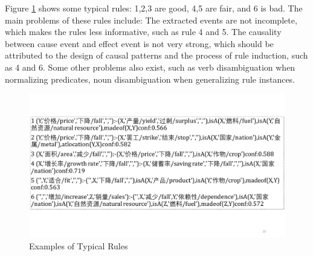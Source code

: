Figure \ref{fig:rules_case} shows some typical rules: 1,2,3 are good, 4,5 are fair, and 6 is bad.
The main problems of these rules include:
The extracted events are not incomplete, which makes the rules less informative, such as rule 4 and 5.
The causality between cause event and effect event is not very strong, which should be attributed to the design of causal patterns and the process of rule induction, such as 4 and 6.
Some other problems also exist, such as verb disambiguation when normalizing predicates, noun disambiguation when generalizing rule instances.
\begin{figure}[htbp]
	\centering
	\includegraphics[width=0.95\columnwidth]{figures/rules_case}
	\caption{Examples of Typical Rules}
	\label{fig:rules_case}
\end{figure}
